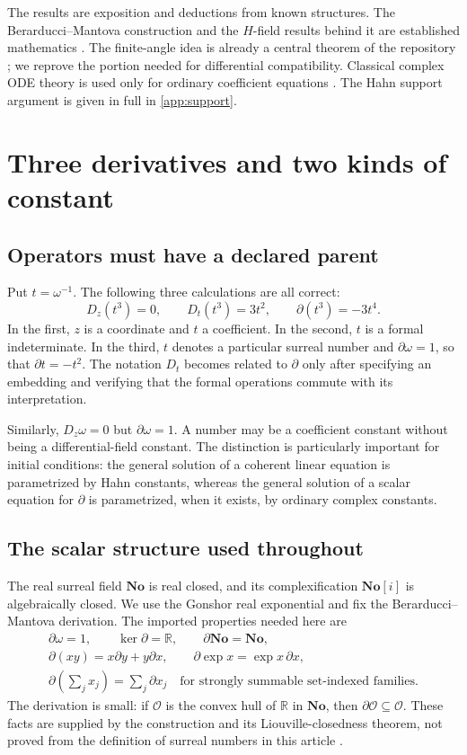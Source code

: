 \documentclass[11pt,letterpaper]{article}
\numberwithin{equation}{section}
\theoremstyle{definition}
\theoremstyle{remark}
\newcommand{\No}{\mathbf{No}}
\newcommand{\SC}{\mathbf{No}[i]}
\newcommand{\R}{\mathbb R}
\newcommand{\OO}{\mathcal O}
\newcommand{\D}{\partial}
\begin{document}
The results are exposition and deductions from known structures. The
Berarducci--Mantova construction and the $H$-field results behind it are
established mathematics \cite{BM,ADH}. The finite-angle idea is already a
central theorem of the repository \cite{RepoTrig}; we reprove the portion
needed for differential compatibility. Classical complex ODE theory is used
only for ordinary coefficient equations \cite{Teschl}. The Hahn support
argument is given in full in \cref{app:support}.

\section{Three derivatives and two kinds of constant}
\label{sec:derivatives}

\subsection{Operators must have a declared parent}
Put $t=\omega^{-1}$. The following three calculations are all correct:
\begin{equation}\label{eq:three}
 D_z(t^3)=0,\qquad D_t(t^3)=3t^2,\qquad \D(t^3)=-3t^4.
\end{equation}
In the first, $z$ is a coordinate and $t$ a coefficient. In the second, $t$
is a formal indeterminate. In the third, $t$ denotes a particular surreal
number and $\D\omega=1$, so that $\D t=-t^2$.
The notation $D_t$ becomes related to $\D$ only after specifying an embedding
and verifying that the formal operations commute with its interpretation.

Similarly, $D_z\omega=0$ but $\D\omega=1$. A number may be a coefficient
constant without being a differential-field constant. The distinction is
particularly important for initial conditions: the general solution of a
coherent linear equation is parametrized by Hahn constants, whereas the
general solution of a scalar equation for $\D$ is parametrized, when it
exists, by ordinary complex constants.

\subsection{The scalar structure used throughout}
The real surreal field $\No$ is real closed, and its complexification
$\SC$ is algebraically closed. We use the Gonshor real exponential and fix
the Berarducci--Mantova derivation. The imported properties needed here are
\begin{equation}\label{eq:BM}
\begin{gathered}
 \D\omega=1,\qquad \ker\D=\R,\qquad \D\No=\No,\\
 \D(xy)=x\D y+y\D x,\qquad
 \D\exp x=\exp x\,\D x,\\
 \D\left(\sum_j x_j\right)=\sum_j\D x_j
 \quad\text{for strongly summable set-indexed families}.
\end{gathered}
\end{equation}
The derivation is small: if $\OO$ is the convex hull of $\R$ in $\No$, then
$\D\OO\subseteq\OO$. These facts are supplied by the construction and its
Liouville-closedness theorem, not proved from the definition of surreal
numbers in this article \cite[Theorems A and B]{BM}.
\end{document}

